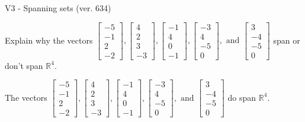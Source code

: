 \begin{exercise}
  \begin{exerciseTitle}V3 - Spanning sets (ver. 634)\end{exerciseTitle}
  \begin{exerciseStatement}
    Explain why the vectors \(\left[\begin{array}{r}
-5 \\
-1 \\
2 \\
-2
\end{array}\right] , \left[\begin{array}{r}
4 \\
2 \\
3 \\
-3
\end{array}\right] , \left[\begin{array}{r}
-1 \\
4 \\
0 \\
-1
\end{array}\right] , \left[\begin{array}{r}
-3 \\
4 \\
-5 \\
0
\end{array}\right] , \text{ and } \left[\begin{array}{r}
3 \\
-4 \\
-5 \\
0
\end{array}\right]\) span or don't span \(\mathbb{R}^4\). 
	


  \end{exerciseStatement}
  \begin{exerciseAnswer}
   The vectors \(\left[\begin{array}{r}
-5 \\
-1 \\
2 \\
-2
\end{array}\right] , \left[\begin{array}{r}
4 \\
2 \\
3 \\
-3
\end{array}\right] , \left[\begin{array}{r}
-1 \\
4 \\
0 \\
-1
\end{array}\right] , \left[\begin{array}{r}
-3 \\
4 \\
-5 \\
0
\end{array}\right] , \text{ and } \left[\begin{array}{r}
3 \\
-4 \\
-5 \\
0
\end{array}\right]\) 
  	 do  
	span \(\mathbb{R}^4\).
  



\end{exerciseAnswer}
\end{exercise}

